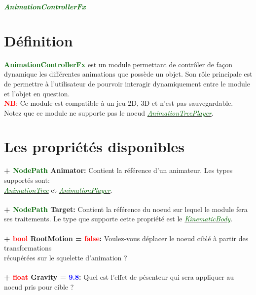 \documentclass[a4paper, 11pt]{article}
\begin{document}
	\pagecolor{silver}
	\huge{\hspace{10.7cm}\textit{\textbf{\textcolor{darkgreen}{AnimationControllerFx}}}}\large{} 
	\tableofcontents \newpage
	\section{Définition}
	\textcolor{darkgreen}{\textbf{AnimationControllerFx}} est un module permettant de contrôler de façon 
	dynamique les différentes animations que possède un objet. Son rôle principale est de permettre à
	l'utilisateur de pourvoir interagir dynamiquement entre le module et l'objet en question.\\
	\textcolor{red}{\textbf{NB}:} Ce module est compatible à un jeu 2D, 3D et n'est pas sauvegardable. Notez
	que ce module ne supporte pas le noeud
	\href{https://docs.godotengine.org/en/stable/classes/class_animationtreeplayer.html}
	{\textit{\textcolor{darkgreen}{AnimationTreePlayer}}}.

	\section{Les propriétés disponibles}
	\textbf{+ \textcolor{darkgreen}{NodePath} Animator:} Contient la référence d'un animateur. Les types
	supportés sont: \href{https://docs.godotengine.org/en/stable/classes/class_animationtree.html}
	{\textit{\textcolor{darkgreen}{\\AnimationTree}}} et
	\href{https://docs.godotengine.org/en/stable/classes/class_animationplayer.html}
	{\textit{\textcolor{darkgreen}{AnimationPlayer}}}.\\\\
	\textbf{+ \textcolor{darkgreen}{NodePath} Target:} Contient la référence du noeud sur lequel le module
	fera ses traitements. Le type que supporte cette propriété est le
	\href{https://docs.godotengine.org/en/stable/classes/class_kinematicbody.html}
	{\textit{\textcolor{darkgreen}{KinematicBody}}}.\\\\
	\textbf{+ \textcolor{red}{bool} RootMotion = \textcolor{red}{false}:} Voulez-vous déplacer le noeud 
	ciblé à partir des transformations \\récupérées sur le squelette d'animation ?\\\\
	\textbf{+ \textcolor{red}{float} Gravity = \textcolor{blue}{9.8}:} Quel est l'effet de pésenteur qui 
	sera appliquer au noeud pris pour cible ?
\end{document}
